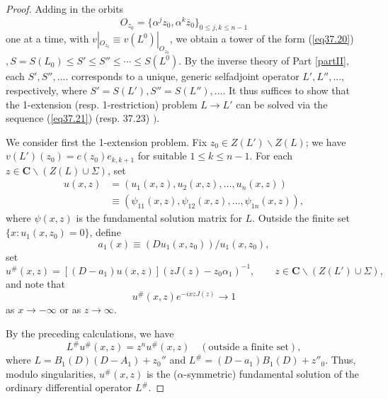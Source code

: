 \documentclass{surv-l}
\theoremstyle{plain}
\theoremstyle{definition}
\numberwithin{equation}{chapter}
\begin{document}
\begin{proof}
Adding in the orbits
\begin{equation*}
O_{z_{0}}=\{\alpha^{j}z_{0}, \alpha^{k}\overline{z}_{0}\}_{0\leq j,k\leq n-1}
\end{equation*}
one at a time, with $v|_{O_{z_{0}}}\equiv v(L^{0})|_{O_{z_{0}}}$, we obtain a tower of the form (\ref{eq37.20})$, S=S(L_{0})\leq S'\leq S''\leq\cdots \leq S(L^{0})$. By the inverse theory of Part \ref{partII}, each $S',S'',\ldots$. corresponds to a unique, generic selfadjoint operator $L',L'',\ldots,$ respectively, where $S'=S(L'),S''=S(L''),\ldots$. It thus suffices to show that the 1-extension (resp. 1-restriction) problem $L\rightarrow L'$ can be solved via the sequence (\ref{eq37.21}) (resp. 37.23) $)$.

We consider first the 1-extension problem. Fix $z_{0}\in Z(L')\backslash Z(L)$; we have $v(L')(z_{0})=c(z_{0})e_{k,k+1}$ for suitable $1\leq k\leq n-1$. For each $z\in \mathbf{C}\backslash (Z(L)\cup\Sigma)$, set
\begin{align*}
u(x, z)&=(u_{1}(x, z),u_{2}(x, z),\ldots, u_{n}(x, z))\\
&\equiv(\psi_{11}(x,z), \psi_{12}(x, z),\ldots,\psi_{1n}(x, z)),
\end{align*}
where $\psi(x, z)$ is the fundamental solution matrix for $L$. Outside the finite set $\{x:u_{1}(x, z_{0})=0\}$, define
\begin{equation}\label{eq37.24}
a_{1}(x)\equiv(Du_{1}(x, z_{0}))/u_{1}(x, z_{0}),
\end{equation}
set
\begin{equation*}
u^{\#}(x,z)=[(D-a_{1})u(x, z)](zJ(z)-z_{0}\alpha_{1})^{-1},\qquad z\in \mathbf{C}\backslash (Z(L')\cup\Sigma),
\end{equation*}
and note that
\begin{equation*}
u^{\#}(x, z)e^{-ixzJ(z)}\rightarrow 1
\end{equation*}
as $x\rightarrow-\infty$ or as $z\rightarrow\infty$.

By the preceding calculations, we have
\begin{equation}\label{eq37.25}
L^{\#}u^{\#}(x,z)=z^{n}u^{\#}(x,z)\quad (\text{outside a finite set}),
\end{equation}
where $L=B_{1}(D)(D-A_{1})+z_{0}''$ and $L^{\#} =(D-a_{1})B_{1}(D)+z''_{0}$. Thus, modulo singularities, $u^{\#}(x,z)$ is the ($\alpha$-symmetric) fundamental solution of the ordinary differential operator $L^{\#}$.


\end{proof}
\end{document}
